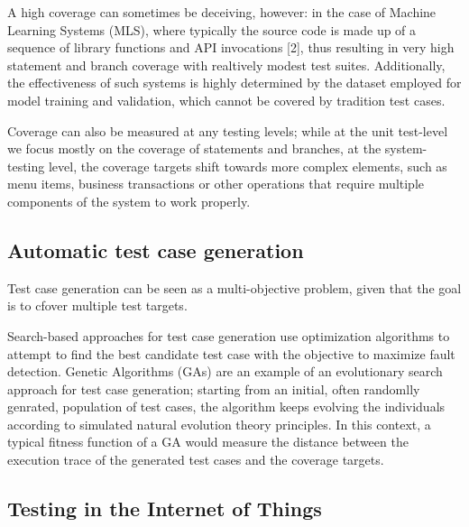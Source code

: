 A high coverage can sometimes be deceiving, however: in the case of Machine Learning Systems (MLS), where typically the source code is made up 
of a sequence of library functions and API invocations [2], thus resulting in very high statement and branch coverage with realtively modest
test suites.
Additionally, the effectiveness of such systems is highly determined by the dataset employed for model training and validation, which
cannot be covered by tradition test cases.

Coverage can also be measured at any testing levels; while at the unit test-level we focus mostly on the coverage of statements and branches,
at the system-testing level, the coverage targets shift towards more complex elements, such as menu items, business transactions or other
operations that require multiple components of the system to work properly.

\subsection*{Automatic test case generation}
Test case generation can be seen as a multi-objective problem, given that the goal is to cfover multiple test targets.

Search-based approaches for test case generation use optimization algorithms to attempt to find 
the best candidate test case with the objective to maximize fault detection. Genetic Algorithms (GAs) are an example of an
evolutionary search approach for test case generation; starting from an initial, often randomlly genrated, population of 
test cases, the algorithm keeps evolving the individuals according to simulated natural evolution theory principles.
In this context, a typical fitness function of a GA would measure the distance between the execution trace of the generated test cases
and the coverage targets.


\subsection*{Testing in the Internet of Things}
